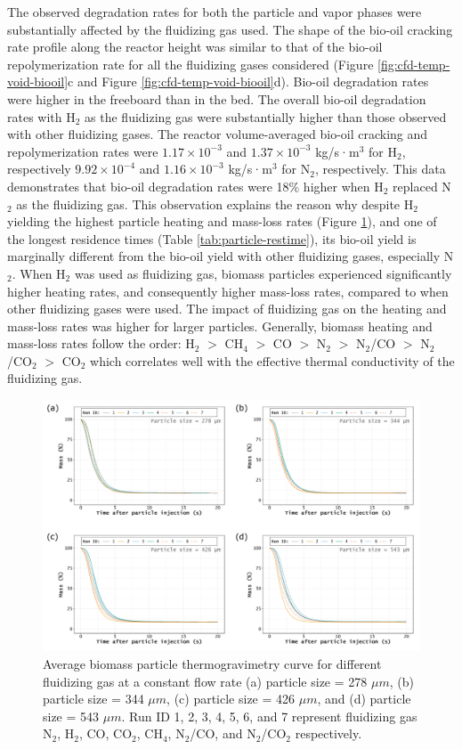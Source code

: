 The observed degradation rates for both the particle and vapor phases were substantially affected by the fluidizing gas used. The shape of the bio-oil cracking rate profile along the reactor height was similar to that of the bio-oil repolymerization rate for all the fluidizing gases considered (Figure \ref{fig:cfd-temp-void-biooil}c and Figure \ref{fig:cfd-temp-void-biooil}d). Bio-oil degradation rates were higher in the freeboard than in the bed. The overall bio-oil degradation rates with H$_2$ as the fluidizing gas were substantially higher than those observed with other fluidizing gases. The reactor volume-averaged bio-oil cracking and repolymerization rates were $1.17\times10^{-3}$ and $1.37\times10^{-3}$ kg/s·m$^3$ for H$_2$, respectively $9.92\times10^{-4}$ and $1.16\times10^{-3}$ kg/s·m$^3$ for N$_2$, respectively. This data demonstrates that bio-oil degradation rates were 18\% higher when H$_2$ replaced N$_2$ as the fluidizing gas. This observation explains the reason why despite H$_2$ yielding the highest particle heating and mass-loss rates (Figure \ref{fig:cfd-masspercent}), and one of the longest residence times (Table \ref{tab:particle-restime}), its bio-oil yield is marginally different from the bio-oil yield with other fluidizing gases, especially N$_2$. When H$_2$ was used as fluidizing gas, biomass particles experienced significantly higher heating rates, and consequently higher mass-loss rates, compared to when other fluidizing gases were used. The impact of fluidizing gas on the heating and mass-loss rates was higher for larger particles. Generally, biomass heating and mass-loss rates follow the order: H$_2$ $>$ CH$_4$ $>$ CO $>$ N$_2$ $>$ N$_2$/CO $>$ N$_2$/CO$_2$ $>$ CO$_2$ which correlates well with the effective thermal conductivity of the fluidizing gas.

\begin{figure}[H]
    \centering
    \includegraphics[width=\textwidth]{figures/cfd-masspercent.pdf}
    \caption{Average biomass particle thermogravimetry curve for different fluidizing gas at a constant flow rate (a) particle size = 278 $\mu m$, (b) particle size = 344 $\mu m$, (c) particle size = 426 $\mu m$, and (d) particle size = 543 $\mu m$. Run ID 1, 2, 3, 4, 5, 6, and 7 represent fluidizing gas N$_2$, H$_2$, CO, CO$_2$, CH$_4$, N$_2$/CO, and N$_2$/CO$_2$ respectively.}
    \label{fig:cfd-masspercent}
\end{figure}

